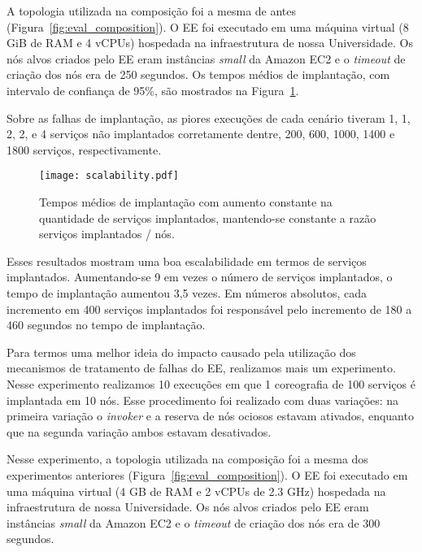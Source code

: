 A topologia utilizada na composição foi a mesma de antes (Figura~\ref{fig:eval_composition}).
O EE foi executado em uma máquina virtual (8 GiB de RAM e 4 vCPUs)
hospedada na infraestrutura de nossa Universidade.
Os nós alvos criados pelo EE eram instâncias \emph{small} da Amazon EC2 e o \emph{timeout} de criação dos nós era de 250 segundos.
Os tempos médios de implantação, com intervalo de confiança de 95\%, são mostrados na Figura~\ref{fig:ee_scalability}.

Sobre as falhas de implantação,
as piores execuções de cada cenário tiveram 1, 1, 2, 2, e 4 serviços não implantados corretamente
dentre, 200, 600, 1000, 1400 e 1800 serviços, respectivamente.

\begin{figure}[h]
  \centering
  \texttt{[image: scalability.pdf]}
  \caption{Tempos médios de implantação com aumento constante na quantidade de serviços implantados, mantendo-se constante a razão serviços implantados / nós.}
  \label{fig:ee_scalability}
\end{figure}

Esses resultados mostram uma boa escalabilidade em termos de serviços implantados.
Aumentando\allowbreak -se 9 em vezes o número de serviços implantados, o tempo de implantação aumentou 3,5 vezes.
Em números absolutos, cada incremento em 400 serviços implantados foi responsável pelo incremento
de 180 a 460 segundos no tempo de implantação.




Para termos uma melhor ideia do impacto causado pela utilização dos mecanismos 
de tratamento de falhas do EE, realizamos mais um experimento.
Nesse experimento realizamos 10 execuções em que 1 coreografia de 100 serviços
é implantada em 10 nós. Esse procedimento foi realizado com duas variações:
na primeira variação o \emph{invoker} e a reserva de nós ociosos estavam ativados,
enquanto que na segunda variação ambos estavam desativados.

Nesse experimento, a topologia utilizada na composição foi a mesma 
dos experimentos anteriores (Figura~\ref{fig:eval_composition}).
O EE foi executado em uma máquina virtual (4 GB de RAM e 2 vCPUs de 2.3 GHz)
hospedada na infraestrutura de nossa Universidade.
Os nós alvos criados pelo EE eram instâncias \emph{small} da Amazon EC2 
e o \emph{timeout} de criação dos nós era de 300 segundos.

